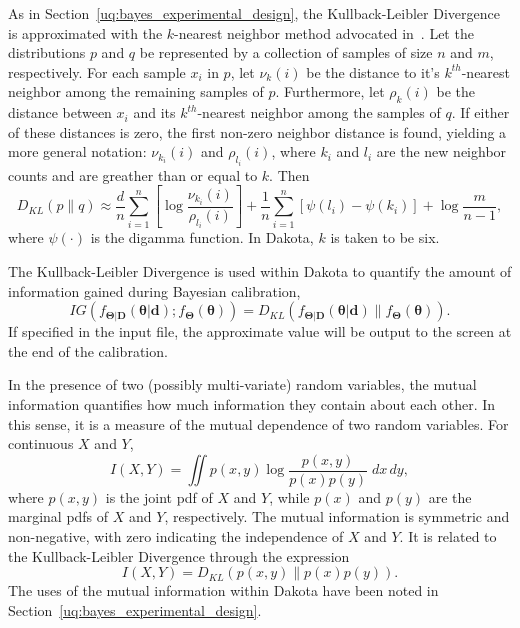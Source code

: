 As in Section~\ref{uq:bayes_experimental_design}, the Kullback-Leibler 
Divergence is approximated with the $k$-nearest neighbor method advocated 
in~\cite{Per2008}. Let the distributions $p$ and $q$ be represented by a 
collection of samples of size $n$ and $m$, respectively. For each sample $x_{i}$
in $p$, let $\nu_{k}(i)$ be the distance to it's $k^{th}$-nearest neighbor among
the remaining samples of $p$. Furthermore, let $\rho_{k}(i)$ be the distance 
between $x_{i}$ and its $k^{th}$-nearest neighbor among the samples of $q$. If 
either of these distances is zero, the first non-zero neighbor distance is 
found, yielding a more general notation: $\nu_{k_i}(i)$ and $\rho_{l_i}(i)$, 
where $k_{i}$ and $l_{i}$ are the new neighbor counts and are greather than or 
equal to $k$. Then 
\begin{equation}
D_{KL}(p \| q) \approx \frac{d}{n} \sum_{i=1}^{n} \left[ \log \frac{
\nu_{k_{i}}(i)}{\rho_{l_{i}}(i)} \right] + \frac{1}{n} \sum_{i=1}^{n} 
\left[ \psi(l_{i}) - \psi(k_{i}) \right] + \log \frac{m}{n-1},
\end{equation}
where $\psi(\cdot)$ is the digamma function. In Dakota, $k$ is taken to be six.

The Kullback-Leibler Divergence is used within Dakota to quantify the amount of
information gained during Bayesian calibration,
\begin{equation}
IG( f_{\boldsymbol{\Theta | D}}(\boldsymbol{\theta| d}); 
f_{\boldsymbol{\Theta}}(\boldsymbol{\theta}))
= D_{KL}( f_{\boldsymbol{\Theta | D}}(\boldsymbol{\theta| d}) \| 
f_{\boldsymbol{\Theta}}(\boldsymbol{\theta}) ). 
\end{equation}
If specified in the input file, the approximate value will be output to the
screen at the end of the calibration.

In the presence of two (possibly multi-variate) random variables, the mutual 
information quantifies how much information they contain about each other. In 
this sense, it is a measure of the mutual dependence of two random variables. 
For continuous $X$ and $Y$, 
\begin{equation}
I(X, Y) = \iint p(x,y) \log \frac{ p(x,y) }{p(x)p(y)} \; dx \, dy,
\end{equation}
where $p(x,y)$ is the joint pdf of $X$ and $Y$, while $p(x)$ and $p(y)$ are the 
marginal pdfs of $X$ and $Y$, respectively. The mutual information is symmetric 
and non-negative, with zero indicating the independence of $X$ and $Y$. It is 
related to the Kullback-Leibler Divergence through the expression
\begin{equation}
I(X,Y) = D_{KL} ( p(x,y) \| p(x) p(y) ). 
\end{equation}
The uses of the mutual information within Dakota have been noted in 
Section~\ref{uq:bayes_experimental_design}.



